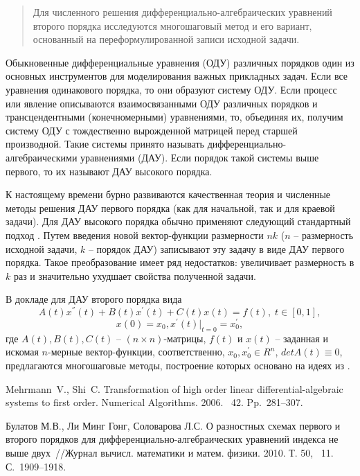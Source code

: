 \begin{abstract}
Для численного решения дифференциально-алгебраических уравнений второго порядка исследуются многошаговый метод и его вариант, основанный на переформулированной записи исходной задачи. 

\end{abstract}

Обыкновенные дифференциальные уравнения (ОДУ) различных порядков один из основных инструментов для моделирования важных прикладных задач. Если все уравнения одинакового порядка, то они образуют систему ОДУ. Если процесс или явление описываются взаимосвязанными ОДУ различных порядков и трансцендентными  (конечномерными) уравнениями, то, объединяя их, получим систему ОДУ с тождественно вырожденной матрицей перед старшей производной. Такие системы принято называть дифференциально-алгебраическими уравнениями (ДАУ). Если порядок такой системы выше первого, то их называют ДАУ высокого порядка. 

К настоящему времени бурно развиваются качественная теория и численные методы решения ДАУ первого порядка (как для начальной, так и для краевой задачи). Для ДАУ высокого порядка обычно применяют следующий стандартный подход \cite{MehDAE2}. Путем введения новой вектор-функции размерности $nk$ ($n$ -- размерность исходной задачи, $k$ -- порядок ДАУ) записывают эту задачу в виде ДАУ первого порядка. Такое преобразование имеет ряд недостатков: увеличивает размерность в $k$ раз и значительно ухудшает свойства полученной задачи.

В докладе для ДАУ второго порядка вида
\begin{equation}									\label{dae2nd}
A(t)x^{''}(t)+B(t)x^{'}(t)+C(t)x(t)=f(t), \;t\in[0,1],
\end{equation}
\begin{equation}									\label{ic2nd}
x(0)=x_{0},x^{'}(t)|_{t=0}=x_{0}^{'},
\end{equation}
где $A(t),B(t),C(t)$ -- $(n\times n)$-матрицы, $f(t)$ и $x(t)$ -- заданная и искомая $ n $-мерные вектор-функции, соответственно, $x_{0}, x_{0}^{'}\in  R^{n}$, $detA(t)\equiv 0$, 
предлагаются многошаговые методы, построение которых основано на идеях из \cite{BulLee}.

\begin{thebibliography}{9} %

Mehrmann~V., Shi~C. Transformation of high order linear differential-algebraic systems to first order. Numerical Algorithms. 2006. \textnumero~42. Pp.~281--307.

Булатов М.В., Ли Минг Гонг, Соловарова Л.С. О разностных схемах первого и второго порядков для дифференциально-алгебраических уравнений индекса не выше двух~//Журнал вычисл. математики и матем. физики. 2010. Т. 50, \textnumero~11. С.~1909--1918. 

\end{thebibliography}




%

